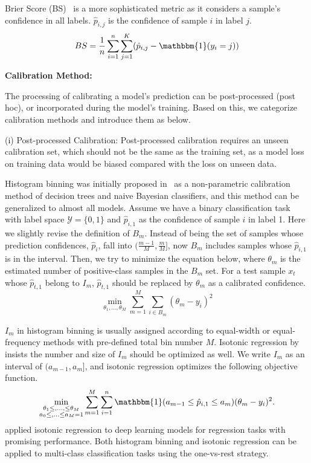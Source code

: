 Brier Score (BS)~\cite{brier1950verification} is a more sophisticated metric as it considers a sample's confidence in all labels. $\hat{p}_{i,j}$ is the confidence of sample $i$ in label $j$.
\begin{equation}
    BS=\frac{1}{n}\sum_{i=1}^n\sum_{j=1}^K(\hat{p}_{i,j}-\mathbbm{1}(y_i=j))
\end{equation}

\textbf{Calibration Method:}

The processing of calibrating a model's prediction can be post-processed (post hoc), or incorporated during the model's training. Based on this, we categorize calibration methods and introduce them as below.

(i) Post-processed Calibration:
Post-processed calibration requires an unseen calibration set, which should not be the same as the training set, as a model loss on training data would be biased compared with the loss on unseen data.

Histogram binning was initially proposed in~\cite{zadrozny2001obtaining} as a non-parametric calibration method of decision trees and naive Bayesian classifiers, and this method can be generalized to almost all models. Assume we have a binary classification task with label space $\mathcal{Y} = \{0,1\}$ and $\hat{p}_{i,1}$ as the confidence of sample $i$ in label 1. Here we slightly revise the definition of $B_m$. Instead of being the set of samples whose prediction confidences, $\hat{p}_i$, fall into $(\frac{m-1}{M},\frac{m}{M}]$, now $B_m$ includes samples whose $\hat{p}_{i,1}$ is in the interval. Then, we try to minimize the equation below, where $\theta_m$ is the estimated number of positive-class samples in the $B_m$ set. For a test sample $x_t$ whose $\hat{p}_{t,1}$ belong to $I_m$, $\hat{p}_{t,1}$ should be replaced by $\theta_m$ as a calibrated confidence.
\begin{equation}
    \min_{\theta_1,...,\theta_M}\sum_{m=1}^M\sum_{i\in B_m}(\theta_m-y_i)^2
\end{equation}

$I_m$ in histogram binning is usually assigned according to equal-width or equal-frequency methods with pre-defined total bin number $M$. Isotonic regression by~\cite{zadrozny2002transforming} insists the number and size of $I_m$ should be optimized as well. We write $I_m$ as an interval of $(a_{m-1},a_m]$, and isotonic regression optimizes the following objective function. 
\begin{equation}
    \min_{\substack{\theta_1 \leq,...,\leq\theta_M\\a_0\leq,...\leq a_M=1}}\sum_{m=1}^M\sum_{i=1}^n\mathbbm{1}(a_{m-1}\leq \hat{p}_{i,1}\leq a_{m})(\theta_m-y_i)^2.
\end{equation}
\cite{kuleshov2018accurate} applied isotonic regression to deep learning
models for regression tasks with promising performance. Both histogram binning and isotonic regression can be applied to multi-class classification tasks using the one-vs-rest strategy.

